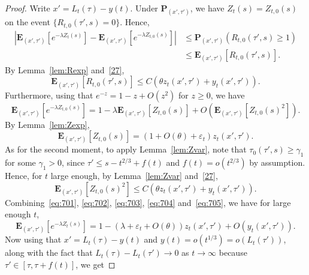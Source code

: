 \documentclass[10pt]{amsart}
\theoremstyle{definition}\newtheorem{defi}[theo]{Definition}\newtheorem{rema}[theo]{Remark}\newtheorem{exam}[theo]{Example}\newtheorem{exem}[theo]{Example}\newtheorem{nota}[theo]{Notation}
\newcommand*\eps{\varepsilon}
\newcommand*\E{\mathbf{E}}
\renewcommand*\P{\mathbf{P}}
\newcommand{\1} {\mathds{1}}
\begin{document}
\begin{proof}
Write $x' = L_t(\tau) - y(t)$. Under $\P_{(x',\tau')}$, we have $Z_t(s) = Z_{t,0}(s)$ on the event $\{R_{t,0}(\tau',s) = 0\}$. Hence,
\begin{equation}\label{eq:701}
\begin{split}
\left|\E_{\left(x',\tau'\right)}\left[e^{-\lambda Z_t(s)}\right] - \E_{\left(x',\tau'\right)}\left[e^{-\lambda Z_{t,0}(s)}\right]\right| &\le \P_{(x',\tau')}\left(R_{t,0}\left(\tau',s\right) \ge 1\right)\\
&\le \E_{\left(x',\tau'\right)}\left[R_{t,0}\left(\tau',s\right)\right].
\end{split}
\end{equation}
By Lemma~\ref{lem:Rexp} and~\eqref{27},
\begin{equation}\label{eq:702}
\E_{\left(x',\tau'\right)}\left[R_{t,0}\left(\tau',s\right)\right] \le C\left(\theta z_t\left(x',\tau'\right) + y_t\left(x',\tau'\right)\right).
\end{equation}
Furthermore, using that $e^{-z} = 1-z+O(z^2)$ for $z\ge 0$, we have
\begin{equation}\label{eq:703}
\E_{\left(x',\tau'\right)}\left[e^{-\lambda Z_{t,0}(s)}\right] = 1 - \lambda \E_{\left(x',\tau'\right)}\left[Z_{t,0}(s)\right] + O\left(\E_{\left(x',\tau'\right)}\left[Z_{t,0}(s)^2\right]\right).
\end{equation}
By Lemma~\ref{lem:Zexp},
\begin{equation}\label{eq:704}
\E_{(x',\tau')}[Z_{t,0}(s)] = (1+O(\theta) + \eps_t) z_t(x',\tau').
\end{equation}
As for the second moment, to apply Lemma~\ref{lem:Zvar}, note that $\tau_0(\tau',s) \ge \gamma_1$ for some $\gamma_1>0$, since $\tau' \le s-t^{2/3} + f(t)$ and $f(t) = o(t^{2/3})$ by assumption. Hence, for $t$ large enough, by Lemma~\ref{lem:Zvar} and~\eqref{27},
\begin{equation}\label{eq:705}
\E_{\left(x',\tau'\right)}\left[Z_{t,0}(s)^2\right] \le C\left(\theta z_t\left(x',\tau'\right) + y_t\left(x',\tau'\right)\right).
\end{equation}
Combining~\eqref{eq:701}, \eqref{eq:702}, \eqref{eq:703}, \eqref{eq:704} and~\eqref{eq:705}, we have for large enough $t$,
\begin{equation}\label{eq:706}
\E_{\left(x',\tau'\right)}\left[e^{-\lambda Z_t(s)}\right] = 1 - \left(\lambda +\eps_t+O(\theta)\right) z_t\left(x',\tau'\right) + O\left(y_t\left(x',\tau'\right)\right).
\end{equation}
Now using that $x' = L_t(\tau) - y(t)$ and $y(t) = o(t^{1/3}) = o(L_t(\tau'))$, along with the fact that $L_t(\tau) - L_t(\tau') \rightarrow 0$ as $t \rightarrow \infty$ because $\tau' \in [\tau, \tau + f(t)]$, we get

\end{proof}
\end{document}
